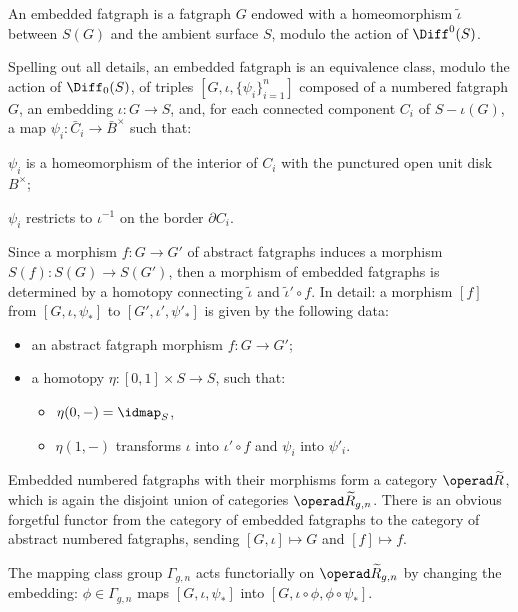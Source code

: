 \begin{definition}\label{dfn:embedded-rg}
  An embedded fatgraph is a fatgraph $G$ endowed with a
  homeomorphism ${\tilde \iota}$ between $S(G)$ and the ambient
  surface $S$, modulo the action of $\Diff^0(S)$.
\end{definition}
Spelling out all details, an embedded fatgraph is an equivalence
class, modulo the action of $\Diff_0(S)$, of triples $[G, \iota,
\{\psi_i\}_{i=1}^n]$ composed of a numbered fatgraph $G$, an
embedding $\iota:G\to S$, and, for each connected component $C_i$ of
$S - \iota(G)$, a map $\psi_i: {\bar C_i} \to {\bar B}^\times$ such
that:
\begin{inparaenum}[\slshape (1)]
\item $\psi_i$ is a homeomorphism of the interior of $C_i$ with the
  punctured open unit disk $B^\times$;
\item $\psi_i$ restricts to $\iota^{-1}$ on the border $\partial C_i$.
\end{inparaenum}

Since a morphism $f:G\to G'$ of abstract fatgraphs induces a morphism
$S(f):S(G)\to S(G')$, then a morphism of embedded fatgraphs is
determined by a homotopy connecting ${\tilde \iota}$ and ${\tilde
  \iota' \circ f}$.  In detail: a morphism $[f]$ from $[G, \iota,
\psi_*]$ to $[G', \iota', \psi'_*]$ is given by the following data:
\begin{itemize}
\item an abstract fatgraph morphism $f:G\to G'$;
\item a homotopy $\eta:[0,1] \times S\to S$, such that:
  \begin{itemize}
  \item $\eta(0,-) = \idmap_S$,
  \item $\eta(1,-)$ transforms $\iota$ into $\iota' \circ f$
    and $\psi_i$ into $\psi'_i$.
  \end{itemize}

\end{itemize}

Embedded numbered fatgraphs with their morphisms form a category
$\ERG$, which is again the disjoint union of categories $\ERG_{g,n}$.
There is an obvious forgetful functor from the category of embedded
fatgraphs to the category of abstract numbered fatgraphs,
sending $[G, \iota] \mapsto G$ and $[f] \mapsto f$.

The mapping class group $\Gamma_{g,n}$ acts functorially on
$\ERG_{g,n}$ by changing the embedding: $\phi \in \Gamma_{g,n}$ maps
$[G, \iota, \psi_*]$ into $[G, \iota \circ \phi, \phi \circ \psi_*]$.

